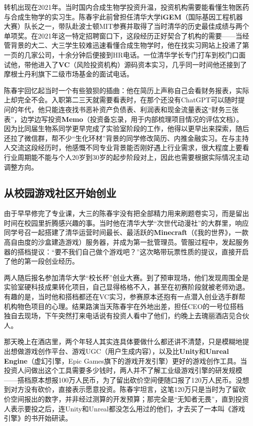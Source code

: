 \documentclass[UTF8,a4paper,11pt,fontset=fandol]{ctexart}
\begin{document}
转机出现在2021年。当时国内合成生物学投资升温，投资机构需要能看懂生物医药与合成生物学的实习生。陈春宇此前曾担任清华大学\textbf{iGEM}（国际基因工程机器大赛）队长之一，带队赴波士顿MIT参赛并取得了当时清华的历史最佳成绩与两个单项奖。在2021年这一特定招聘窗口下，这段经历正好契合了机构的需要——当经管背景的大二、大三学生较难迅速看懂合成生物学时，他在找实习网站上投递了第一页的几家公司，十余分钟后便接到HR电话。一位清华学长专门打车到校门口面试他，带他进入了\textbf{VC}（风险投资机构）源码资本实习，几乎同一时间他还接到了摩根士丹利旗下二级市场基金的面试电话。

陈春宇回忆起当时一个有些狼狈的插曲：他在简历上声称自己会看财务报表，实际上却完全不会。入职第二三天就需要看表时，在那个还没有ChatGPT可以随时提问的年代，他只能连夜找书恶补资产负债表、利润表和现金流量表这“财务三张表”，边学边写投资\textbf{Memo}（投资备忘录，用于内部梳理项目情况的评估文档）。因为比同届生物系同学更早完成了实验室阶段的工作，他得以更早出来探索，随后还拉了微信群，帮不少“生化环材”背景的同学修改简历、内推金融实习。在与主持人交流这段经历时，他感慨不同专业背景能否刚好遇上行业需求，很大程度上要看行业周期能不能与个人20岁到30岁的起步阶段对上，因此也需要根据实际情况主动调整方向。

\subsection{从校园游戏社区开始创业}
由于早早修完了专业课，大三的陈春宇没有把全部精力用来刷题卷实习，而是留出时间在校园里折腾感兴趣的事。当时他在清华大学“次世代动漫社”的大群里，响应同学号召一起搭建了清华运营时间最长、最活跃的\textbf{Minecraft}（《我的世界》，一款高自由度的沙盒建造游戏）服务器，并成为第一批管理员。管服过程中，发起服务器的搭档提议：“要不我们自己做个游戏吧？”这次略带玩票性质的提议，直接开启了他的第一段创业经历。

两人随后报名参加清华大学“校长杯”创业大赛。到了预审现场，他们发现周围全是实验室硬科技成果转化项目，自己显得格格不入，甚至在初赛阶段就被老师劝退。有趣的是，当时他和搭档都还在VC实习，参赛原本还抱有一点潜入创业选手群帮机构物色项目的心理。结果路演当天陈春宇在外地出差，担任CEO的一号位搭档独自去现场，下午突然打来电话说有投资人看中了他们，约晚上去瑰丽酒店见合伙人。

那天晚上在酒店里，两个年轻人其实连具体要做什么都还讲不清楚，只是模糊地提出想做游戏创作平台、游戏UGC（用户生成内容），以及比\textbf{Unity}和\textbf{Unreal Engine}（虚幻引擎，Epic Games旗下的游戏开发引擎）更好的游戏创作工具。当投资人问做出这个工具需要多少钱时，两人并不了解工业级游戏引擎的研发规模——搭档原本想报100万人民币，为了留出砍价空间便随口报了120万人民币。没想到对方没有砍价，直接表示愿意投资。陈春宇坦言，这笔120万只是当时为了留砍价空间报出的数字，并非经过测算的开发预算；那完全是“无知者无畏”，直到投资人表示要投之后，连Unity和Unreal都没怎么用过的他们，才去买了一本叫《游戏引擎》的书开始研读。
\end{document}
